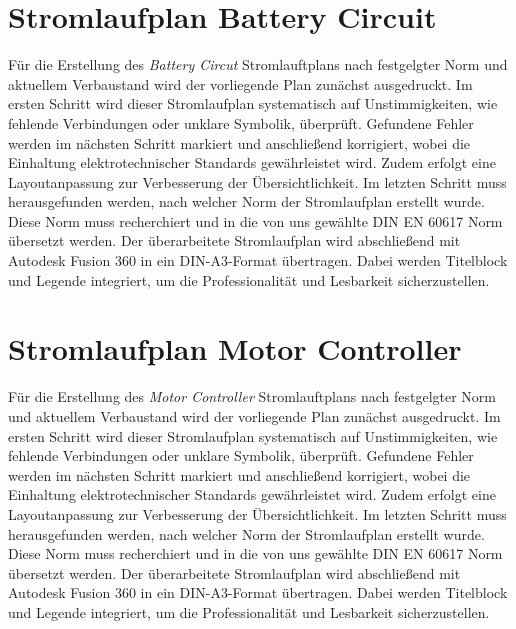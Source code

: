 \section*{Stromlaufplan Battery Circuit}
Für die Erstellung des \textit{Battery Circut} Stromlauftplans nach festgelgter Norm und aktuellem Verbaustand wird der vorliegende Plan zunächst ausgedruckt. Im ersten Schritt wird dieser Stromlaufplan systematisch auf Unstimmigkeiten, wie fehlende Verbindungen oder unklare Symbolik, überprüft. Gefundene Fehler werden im nächsten Schritt markiert und anschließend korrigiert, wobei die Einhaltung elektrotechnischer Standards gewährleistet wird. Zudem erfolgt eine Layoutanpassung zur Verbesserung der Übersichtlichkeit. Im letzten Schritt muss herausgefunden werden, nach welcher Norm der Stromlaufplan erstellt wurde. Diese Norm muss recherchiert und in die von uns gewählte DIN EN 60617 Norm \glqq übersetzt\grqq {} werden. Der überarbeitete Stromlaufplan wird abschließend mit Autodesk Fusion 360 in ein DIN-A3-Format übertragen. Dabei werden Titelblock und Legende integriert, um die Professionalität und Lesbarkeit sicherzustellen. 
 

\addtocounter{page}{1} 
\section*{Stromlaufplan Motor Controller}
Für die Erstellung des \textit{Motor Controller} Stromlauftplans nach festgelgter Norm und aktuellem Verbaustand wird der vorliegende Plan zunächst ausgedruckt. Im ersten Schritt wird dieser Stromlaufplan systematisch auf Unstimmigkeiten, wie fehlende Verbindungen oder unklare Symbolik, überprüft. Gefundene Fehler werden im nächsten Schritt markiert und anschließend korrigiert, wobei die Einhaltung elektrotechnischer Standards gewährleistet wird. Zudem erfolgt eine Layoutanpassung zur Verbesserung der Übersichtlichkeit. Im letzten Schritt muss herausgefunden werden, nach welcher Norm der Stromlaufplan erstellt wurde. Diese Norm muss recherchiert und in die von uns gewählte DIN EN 60617 Norm \glqq übersetzt\grqq {} werden. Der überarbeitete Stromlaufplan wird abschließend mit Autodesk Fusion 360 in ein DIN-A3-Format übertragen. Dabei werden Titelblock und Legende integriert, um die Professionalität und Lesbarkeit sicherzustellen. 
 
\addtocounter{page}{1} 
